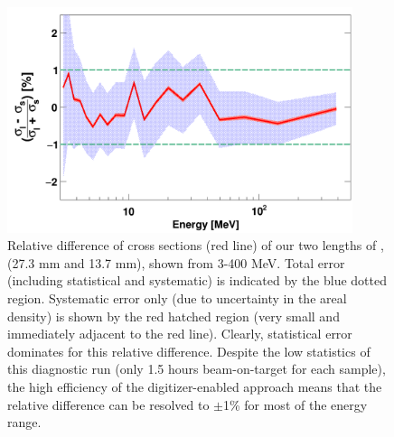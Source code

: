 \begin{figure}[ht!]
    \centering
    \includegraphics[width=0.9\textwidth]{figures/relativeDiff_longCarbonShortCarbon.png}
    \caption[Neutron \tot\ relative difference between short and long \cNat\ samples]
    {
        Relative difference of cross sections (red line) of
        our two lengths of \cNat, (27.3 mm and 13.7 mm), shown from 3-400
        MeV. Total error
        (including statistical and systematic) is indicated by the blue
        dotted region. Systematic error only (due to uncertainty in the areal
        density) is shown by the red hatched region (very small and immediately adjacent to 
        the red line). Clearly, statistical error dominates for this relative
        difference.
        Despite the low statistics of this diagnostic run (only 1.5 hours
        beam-on-target for each sample), the high efficiency of the
        digitizer-enabled approach means that the relative difference can be resolved to 
        $\pm$1\% for most of the energy range.
    }

    \label{CarbonBenchmarking}
\end{figure}


